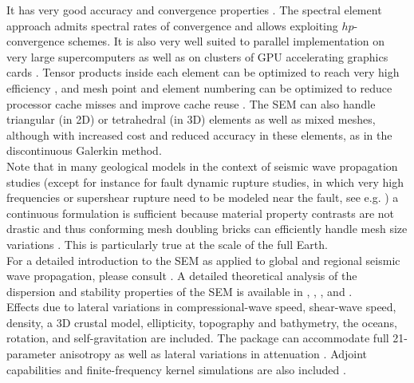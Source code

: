 \documentclass[oneside,english]{book}
\begin{document}
It has very good accuracy and convergence properties \citep{MaPa89,SePr94,DeFiMu02,Coh02,DeSe07,SeOl08,AiWa09,AiWa10,MeStTh12}.
The spectral element approach admits spectral rates of convergence and allows exploiting $hp$-convergence schemes.
It is also very well suited to parallel implementation on very large supercomputers \citep{KoTsChTr03,TsKoChTr03,KoLaMi08a,CaKoLaTiMiLeSnTr08,KoViCh10} as well as on clusters of GPU accelerating graphics cards \citep{KoMiEr09,KoErGoMi10,Kom11}. Tensor products inside each element can be optimized to reach very high efficiency \citep{DeFiMu02}, and mesh point and element numbering can be optimized to reduce processor cache misses and improve cache reuse \citep{KoLaMi08a}. The SEM can also handle triangular (in 2D) or tetrahedral (in 3D) elements \citep{WinBoyd96,TaWi00,KoMaTrTaWi01,Coh02,MeViSa06} as well as mixed meshes, although with increased cost and reduced accuracy in these elements, as in the discontinuous Galerkin method.\\

Note that in many geological models in the context of seismic wave propagation studies
(except for instance for fault dynamic rupture studies, in which very high frequencies or supershear rupture need to be modeled near the fault, see e.g. \cite{BeGlCrViPi07,BeGlCrVi09,PuAmKa09,TaCrEtViBeSa10})
a continuous formulation is sufficient because material property contrasts are not drastic and thus
conforming mesh doubling bricks can efficiently handle mesh size variations \citep{KoTr02a,KoLiTrSuStSh04,LeChLiKoHuTr08,LeChKoHuTr09,LeKoHuTr09}.
This is particularly true at the scale of the full Earth.\\

For a detailed introduction to the SEM as applied to
global and regional seismic wave propagation, please consult \citet{TrKoLi08,PeKoLuMaLeCaLeMaLiBlNiBaTr11,KoVi98,KoTr99,Ch00,KoTr02a,KoTr02b,KoRiTr02,ChCaVi03,CaChViMo03,ChVa04,ChKoViCaVaFe07}.
A detailed theoretical analysis of the dispersion
and stability properties of the SEM is available in \citet{Coh02}, \citet{DeSe07}, \citet{SeOl07}, \citet{SeOl08} and \citet{MeStTh12}.\\

Effects due to lateral variations in compressional-wave
speed, shear-wave speed, density, a 3D crustal model, ellipticity,
topography and bathymetry, the oceans, rotation, and self-gravitation are included.
The package can accommodate full 21-parameter anisotropy \citep{ChTr07}
as well as lateral variations in attenuation \citep{SaKoTr10}. Adjoint
capabilities and finite-frequency kernel simulations are also included
\citep{TrKoLi08,PeKoLuMaLeCaLeMaLiBlNiBaTr11,LiTr06,LiTr08,FiIgBuKe09,ViOp09}.\\
\end{document}
